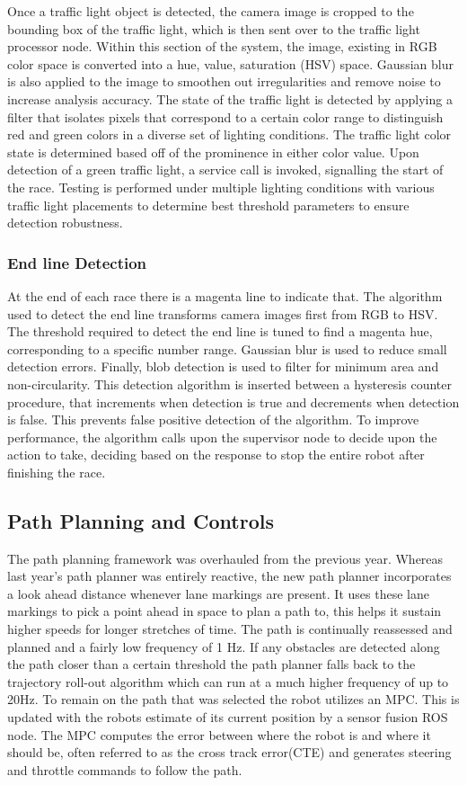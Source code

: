 \documentclass[11pt,journal]{IEEEtran}
\begin{document}
Once a traffic light object is detected, the camera image is cropped to the bounding box of the traffic light, which is then sent over to the traffic light processor node. Within this section of the system, the image, existing in RGB color space is converted into a hue, value, saturation (HSV) space. Gaussian blur is also applied to the image to smoothen out irregularities and remove noise to increase analysis accuracy. The state of the traffic light is detected by applying a filter that isolates pixels that correspond to a certain color range to distinguish red and green colors in a diverse set of lighting conditions. The traffic light color state is determined based off of the prominence in either color value. Upon detection of a green traffic light, a service call is invoked, signalling the start of the race. Testing is performed under multiple lighting conditions with various traffic light placements to determine best threshold parameters to ensure detection robustness.


\subsubsection{End line Detection}
At the end of each race there is a magenta line to indicate that. The algorithm used to detect the end line transforms camera images first from RGB to HSV. The threshold required to detect the end line is tuned to find a magenta hue, corresponding to a specific number range. Gaussian blur is used to reduce small detection errors. Finally, blob detection is used to filter for minimum area and non-circularity. This detection algorithm is inserted between a hysteresis counter procedure, that increments when detection is true and decrements when detection is false. This prevents false positive detection of the algorithm. To improve performance, the algorithm calls upon the supervisor node to decide upon the action to take, deciding based on the response to stop the entire robot after finishing the race.

\subsection{Path Planning and Controls}
The path planning framework was overhauled from the previous year. Whereas last year's path planner was entirely reactive, the new path planner incorporates a look ahead distance whenever lane markings are present. It uses these lane markings to pick a point ahead in space to plan a path to, this helps it sustain higher speeds for longer stretches of time. The path is continually reassessed and planned and a fairly low frequency of 1 Hz. If any obstacles are detected along the path closer than a certain threshold the path planner falls back to the trajectory roll-out algorithm which can run at a much higher frequency of up to 20Hz.
To remain on the path that was selected the robot utilizes an MPC. This is updated with the robots estimate of its current position by a sensor fusion ROS node. The MPC computes the error between where the robot is and where it should be, often referred to as the cross track error(CTE) and generates steering and throttle commands to follow the path.
\end{document}
